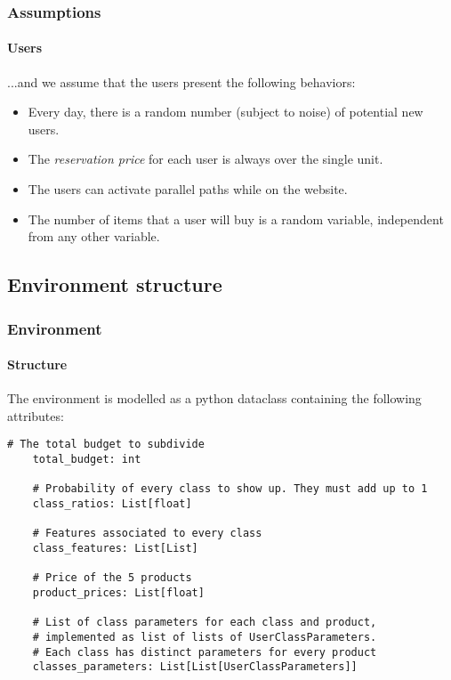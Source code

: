 \documentclass[11pt]{beamer}
\begin{document}

\begin{frame}

\frametitle{Assumptions}
\framesubtitle{Users}

...and we assume that the users present the following behaviors:
\begin{itemize}[label={-}]
    \item Every day, there is a random number (subject to noise) of potential new users.
    \item The \textit{reservation price} for each user is always over the single unit. 
    \item The users can activate parallel paths while on the website.
    \item The number of items that a user will buy is a random variable, independent from any other variable.
\end{itemize}


\end{frame}


\subsection{Environment structure}


\begin{frame}[fragile]

\frametitle{Environment}
\framesubtitle{Structure}

The environment is modelled as a python dataclass containing the following attributes:

\begin{lstlisting}[style=Python, basicstyle=\tiny, numbers=none, framexrightmargin=-20pt]
    # The total budget to subdivide
    total_budget: int

    # Probability of every class to show up. They must add up to 1
    class_ratios: List[float]

    # Features associated to every class
    class_features: List[List]

    # Price of the 5 products
    product_prices: List[float]

    # List of class parameters for each class and product,
    # implemented as list of lists of UserClassParameters.
    # Each class has distinct parameters for every product
    classes_parameters: List[List[UserClassParameters]]
\end{lstlisting}

\end{frame}
\end{document}

